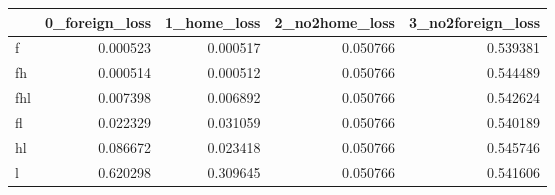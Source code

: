\begin{tabular}{lrrrr}
\toprule
 & 0_foreign_loss & 1_home_loss & 2_no2home_loss & 3_no2foreign_loss \\
\midrule
f & 0.000523 & 0.000517 & 0.050766 & 0.539381 \\
fh & 0.000514 & 0.000512 & 0.050766 & 0.544489 \\
fhl & 0.007398 & 0.006892 & 0.050766 & 0.542624 \\
fl & 0.022329 & 0.031059 & 0.050766 & 0.540189 \\
hl & 0.086672 & 0.023418 & 0.050766 & 0.545746 \\
l & 0.620298 & 0.309645 & 0.050766 & 0.541606 \\
\bottomrule
\end{tabular}
